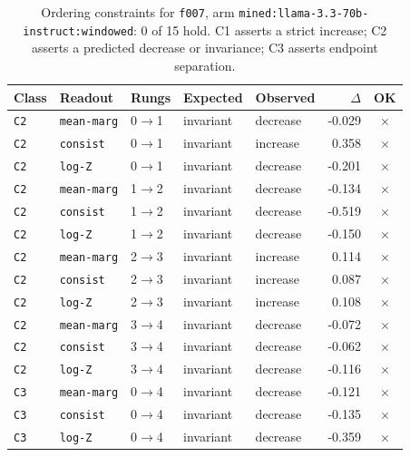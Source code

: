 \documentclass[11pt]{article}
\begin{document}
\begin{table}[htbp]
\centering
\small
\caption{Ordering constraints for \texttt{f007}, arm \texttt{mined:llama-3.3-70b-instruct:windowed}: 0 of 15 hold. C1 asserts a strict increase; C2 asserts a predicted decrease or invariance; C3 asserts endpoint separation.}
\label{tab:ladder-f007-mined-llama-3-3-70b-instruct-windowed}
\begin{tabular}{lllllrc}
\toprule
Class & Readout & Rungs & Expected & Observed & $\Delta$ & OK \\
\midrule
\texttt{C2} & \texttt{mean-marg} & 0$\to$1 & invariant & decrease & -0.029 & $\times$ \\
\texttt{C2} & \texttt{consist} & 0$\to$1 & invariant & increase & 0.358 & $\times$ \\
\texttt{C2} & \texttt{log-Z} & 0$\to$1 & invariant & decrease & -0.201 & $\times$ \\
\texttt{C2} & \texttt{mean-marg} & 1$\to$2 & invariant & decrease & -0.134 & $\times$ \\
\texttt{C2} & \texttt{consist} & 1$\to$2 & invariant & decrease & -0.519 & $\times$ \\
\texttt{C2} & \texttt{log-Z} & 1$\to$2 & invariant & decrease & -0.150 & $\times$ \\
\texttt{C2} & \texttt{mean-marg} & 2$\to$3 & invariant & increase & 0.114 & $\times$ \\
\texttt{C2} & \texttt{consist} & 2$\to$3 & invariant & increase & 0.087 & $\times$ \\
\texttt{C2} & \texttt{log-Z} & 2$\to$3 & invariant & increase & 0.108 & $\times$ \\
\texttt{C2} & \texttt{mean-marg} & 3$\to$4 & invariant & decrease & -0.072 & $\times$ \\
\texttt{C2} & \texttt{consist} & 3$\to$4 & invariant & decrease & -0.062 & $\times$ \\
\texttt{C2} & \texttt{log-Z} & 3$\to$4 & invariant & decrease & -0.116 & $\times$ \\
\texttt{C3} & \texttt{mean-marg} & 0$\to$4 & invariant & decrease & -0.121 & $\times$ \\
\texttt{C3} & \texttt{consist} & 0$\to$4 & invariant & decrease & -0.135 & $\times$ \\
\texttt{C3} & \texttt{log-Z} & 0$\to$4 & invariant & decrease & -0.359 & $\times$ \\
\bottomrule
\end{tabular}
\end{table}
\end{document}
